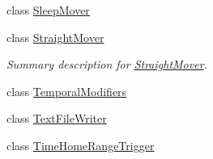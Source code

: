 \begin{DoxyCompactItemize}
class \hyperlink{class_p_a_z___dispersal_1_1_sleep_mover}{Sleep\-Mover}
\begin{DoxyCompactList}\small\item\em \end{DoxyCompactList}\item 
class \hyperlink{class_p_a_z___dispersal_1_1_straight_mover}{Straight\-Mover}
\begin{DoxyCompactList}\small\item\em Summary description for \hyperlink{class_p_a_z___dispersal_1_1_straight_mover}{Straight\-Mover}. \end{DoxyCompactList}\item 
class \hyperlink{class_p_a_z___dispersal_1_1_temporal_modifiers}{Temporal\-Modifiers}
\item 
class \hyperlink{class_p_a_z___dispersal_1_1_text_file_writer}{Text\-File\-Writer}
\item 
class \hyperlink{class_p_a_z___dispersal_1_1_time_home_range_trigger}{Time\-Home\-Range\-Trigger}
\end{DoxyCompactItemize}
